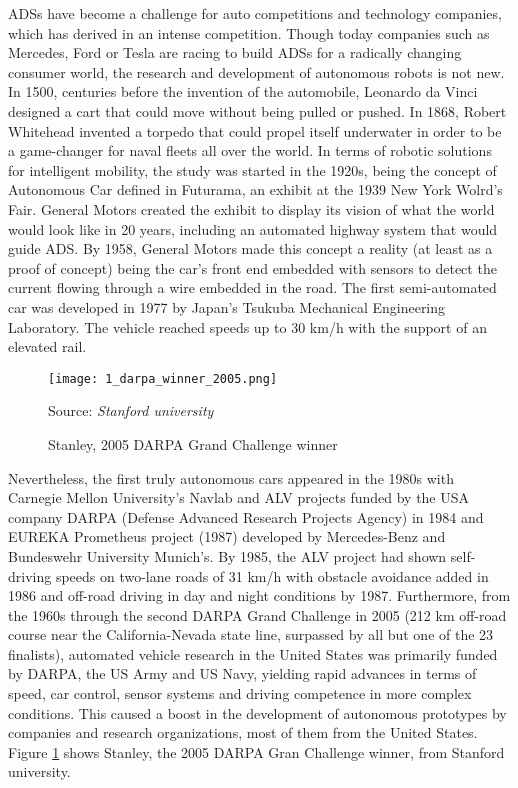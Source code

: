\acp{ADS} have become a challenge for auto competitions and technology companies, which has derived in an intense competition. Though today companies such as Mercedes, Ford or Tesla are racing to build \acp{ADS} for a radically changing consumer world, the research and development of autonomous robots is not new. \\

In 1500, centuries before the invention of the automobile, Leonardo da Vinci designed a cart that could move without being pulled or pushed. In 1868, Robert Whitehead invented a torpedo that could propel itself underwater in order to be a game-changer for naval fleets all over the world. In terms of robotic solutions for intelligent mobility, the study was started in the 1920s, being the concept of Autonomous Car defined in Futurama, an exhibit at the 1939 New York Wolrd's Fair. General Motors created the exhibit to display its vision of what the world would look like in 20 years, including an automated highway system that would guide \ac{ADS}. By 1958, General Motors made this concept a reality (at least as a proof of concept) being the car's front end embedded with sensors to detect the current flowing through a wire embedded in the road. The first semi-automated car was developed in 1977 by Japan’s Tsukuba Mechanical Engineering Laboratory. The vehicle reached speeds up to 30 km/h with the support of an elevated rail. \\

\begin{figure}[h]
	\centering
	\texttt{[image: 1\_darpa\_winner\_2005.png]}
	\caption{Stanley, 2005 DARPA Grand Challenge winner}
	Source: \textit{Stanford university}
	\label{fig:1_darpa_winner_2005}
\end{figure}

Nevertheless, the first truly autonomous cars appeared in the 1980s with Carnegie Mellon University’s Navlab and ALV projects funded by the USA company DARPA (Defense Advanced Research Projects Agency) in 1984 and EUREKA Prometheus project (1987) developed by Mercedes-Benz and Bundeswehr University Munich’s. By 1985, the ALV project had shown self-driving speeds on two-lane roads of 31 km/h with obstacle avoidance added in 1986 and off-road driving in day and night conditions by 1987. Furthermore, from the 1960s through the second DARPA Grand Challenge in 2005 (212 km off-road course near the California-Nevada state line, surpassed by all but one of the 23 finalists), automated vehicle research in the United States was primarily funded by DARPA, the US Army and US Navy, yielding rapid advances in terms of speed, car control, sensor systems and driving competence in more complex conditions. This caused a boost in the development of autonomous prototypes by companies and research organizations, most of them from the United States. Figure \ref{fig:1_darpa_winner_2005} shows Stanley, the 2005 DARPA Gran Challenge winner, from Stanford university. \\

